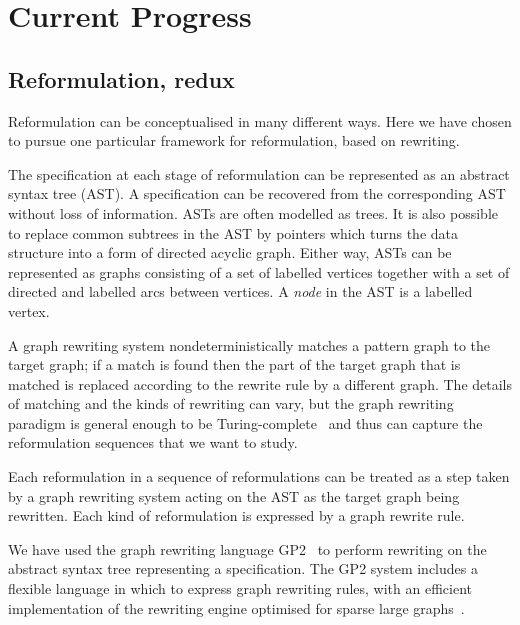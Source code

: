\documentclass[a4paper,UKenglish,cleveref, autoref,pdfa]{lipics-v2021}
\begin{document}
\section{Current Progress}


\subsection{Reformulation, redux}

Reformulation can be conceptualised in many different ways.
Here we have chosen to pursue one particular framework for reformulation, based on rewriting.

The specification at each stage of reformulation can be represented as an abstract syntax tree (AST).
A specification can be recovered from the corresponding AST without loss of information.
ASTs are often modelled as trees.
It is also possible to replace common subtrees in the AST by pointers which turns the data structure into a form of directed acyclic graph.
Either way, ASTs can be represented as graphs consisting of a set of labelled vertices together with a set of directed and labelled arcs between vertices.
A \emph{node} in the AST is a labelled vertex.

A graph rewriting system nondeterministically matches a pattern graph to the target graph; if a match is found then the part of the target graph that is matched is replaced according to the rewrite rule by a different graph.
The details of matching and the kinds of rewriting can vary, but the graph rewriting paradigm is general enough to be Turing-complete~\cite{habel2001computational} and thus can capture the reformulation sequences that we want to study.

Each reformulation in a sequence of reformulations can be treated as a step taken by a graph rewriting system acting on the AST as the target graph being rewritten.
Each kind of reformulation is expressed by a graph rewrite rule.

We have used the graph rewriting language GP2~\cite{plump2017imperative} to perform rewriting on the abstract syntax tree representing a specification.
The GP2 system includes a flexible language in which to express graph rewriting rules, with an efficient implementation of the rewriting engine optimised for sparse large graphs~\cite{campbell2020improved}.
\end{document}
